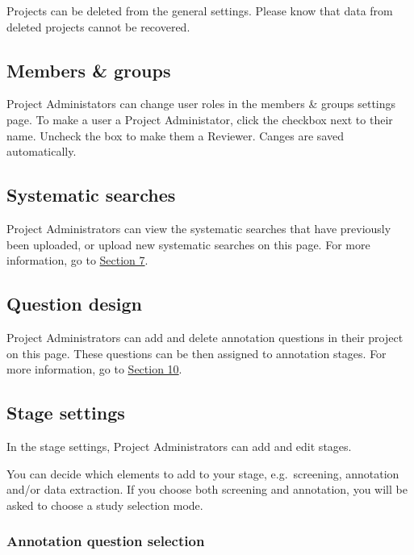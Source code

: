 \documentclass[
]{book}
\begin{document}
Projects can be deleted from the general settings. Please know that data from deleted projects cannot be recovered.

\hypertarget{members-groups}{%
\subsection{Members \& groups}\label{members-groups}}

Project Administators can change user roles in the members \& groups settings page. To make a user a Project Administator, click the checkbox next to their name. Uncheck the box to make them a Reviewer. Canges are saved automatically.

\hypertarget{systematic-searches}{%
\subsection{Systematic searches}\label{systematic-searches}}

Project Administrators can view the systematic searches that have previously been uploaded, or upload new systematic searches on this page. For more information, go to \href{https://camaradesuk.github.io/syrf_userguide/systematicSearch.html}{Section 7}.

\hypertarget{question-design}{%
\subsection{Question design}\label{question-design}}

Project Administrators can add and delete annotation questions in their project on this page. These questions can be then assigned to annotation stages. For more information, go to \href{https://camaradesuk.github.io/syrf_userguide/projectannotation.html}{Section 10}.

\hypertarget{stage-settings}{%
\subsection{Stage settings}\label{stage-settings}}

In the stage settings, Project Administrators can add and edit stages.

You can decide which elements to add to your stage, e.g.~screening, annotation and/or data extraction. If you choose both screening and annotation, you will be asked to choose a study selection mode.

\hypertarget{annotation-question-selection}{%
\subsubsection{Annotation question selection}\label{annotation-question-selection}}
\end{document}
